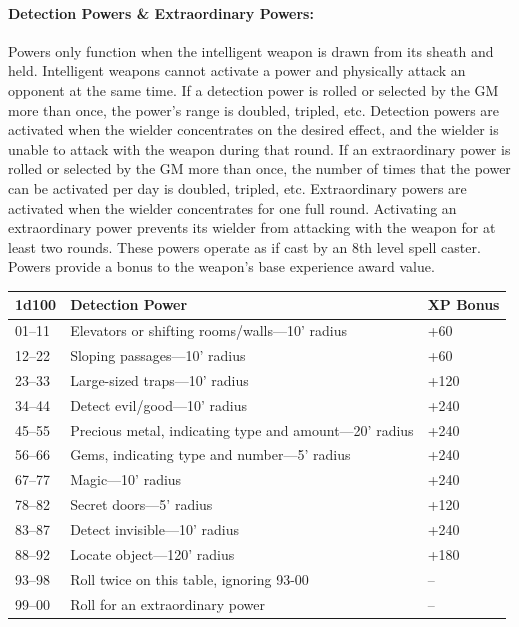 \begin{multicols}{2}
\paragraph{Detection Powers \& Extraordinary Powers:} Powers only function when the intelligent weapon is drawn from its sheath and held.  Intelligent weapons cannot activate a power and physically attack an opponent at the same time.  If a detection power is rolled or selected by the GM more than once, the power's range is doubled, tripled, etc.  Detection powers are activated when the wielder concentrates on the desired effect, and the wielder is unable to attack with the weapon during that round.  If an extraordinary power is rolled or selected by the GM more than once, the number of times that the power can be activated per day is doubled, tripled, etc.  Extraordinary powers are activated when the wielder concentrates for one full round.  Activating an extraordinary power prevents its wielder from attacking with the weapon for at least two rounds.  These powers operate as if cast by an 8th level spell caster.  Powers provide a bonus to the weapon's base experience award value.

\noindent \begin{minipage}{\columnwidth}

\label{detectionpowers}
\noindent \begin{tabular}{|p{}|p{}|p{}|}
\hline
1d100	& Detection Power	& XP Bonus \\
\hline\hline
\rowcolor[gray]{0.9}01--11	& Elevators or shifting rooms/walls---10' radius	& +60 \\
12--22	& Sloping passages---10' radius	& +60 \\
\rowcolor[gray]{0.9}23--33	& Large-sized traps---10' radius	& +120 \\
34--44	& Detect evil/good---10' radius	& +240 \\
\rowcolor[gray]{0.9}45--55	& Precious metal, indicating type and amount---20' radius	& +240 \\
56--66	& Gems, indicating type and number---5' radius	& +240 \\
\rowcolor[gray]{0.9}67--77	& Magic---10' radius	& +240 \\
78--82	& Secret doors---5' radius	& +120 \\
\rowcolor[gray]{0.9}83--87	& Detect invisible---10' radius	& +240 \\
88--92	& Locate object---120' radius	& +180 \\
\rowcolor[gray]{0.9}93--98	& Roll twice on this table, ignoring 93-00	& -- \\
99--00	& Roll for an extraordinary power	& -- \\
\hline
\end{tabular}


\end{minipage}
\end{multicols}
